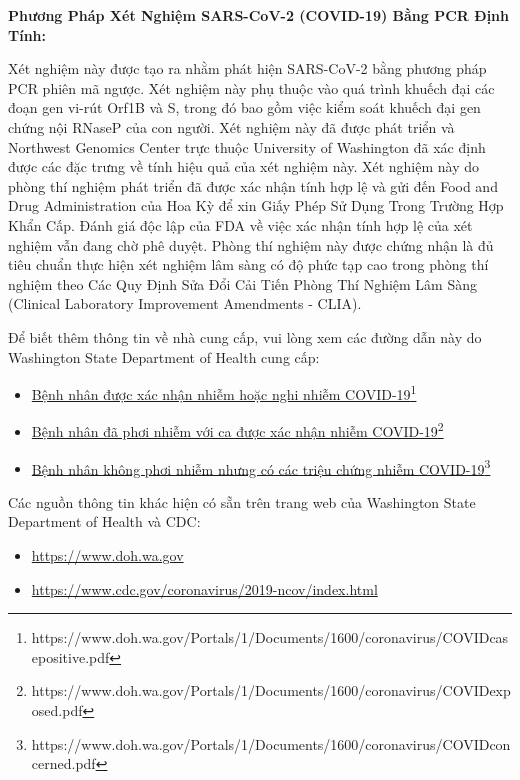 \documentclass[10pt]{article}
\newcommand{\link}[2]{\href{#1}{#2}\footnote{#1}}
\begin{document}
\bigskip
\textbf{Phương Pháp Xét Nghiệm SARS-CoV-2 (COVID-19) Bằng PCR Định Tính:}

Xét nghiệm này được tạo ra nhằm phát hiện SARS-CoV-2 bằng phương pháp PCR phiên
mã ngược. Xét nghiệm này phụ thuộc vào quá trình khuếch đại các đoạn gen vi-rút
Orf1B và S, trong đó bao gồm việc kiểm soát khuếch đại gen chứng nội RNaseP của
con người. Xét nghiệm này đã được phát triển và Northwest Genomics Center trực
thuộc University of Washington đã xác định được các đặc trưng về tính hiệu quả
của xét nghiệm này. Xét nghiệm này do phòng thí nghiệm phát triển đã được xác
nhận tính hợp lệ và gửi đến Food and Drug Administration của Hoa Kỳ để xin Giấy
Phép Sử Dụng Trong Trường Hợp Khẩn Cấp. Đánh giá độc lập của FDA về việc xác
nhận tính hợp lệ của xét nghiệm vẫn đang chờ phê duyệt. Phòng thí nghiệm này
được chứng nhận là đủ tiêu chuẩn thực hiện xét nghiệm lâm sàng có độ phức tạp
cao trong phòng thí nghiệm theo Các Quy Định Sửa Đổi Cải Tiến Phòng Thí Nghiệm
Lâm Sàng (Clinical Laboratory Improvement Amendments - CLIA).

Để biết thêm thông tin về nhà cung cấp, vui lòng xem các đường dẫn này do
Washington State Department of Health cung cấp:

\begin{itemize}
\item

  \link{https://www.doh.wa.gov/Portals/1/Documents/1600/coronavirus/COVIDcasepositive.pdf}{Bệnh
  nhân được xác nhận nhiễm hoặc nghi nhiễm COVID-19}

\item

  \link{https://www.doh.wa.gov/Portals/1/Documents/1600/coronavirus/COVIDexposed.pdf}{Bệnh
  nhân đã phơi nhiễm với ca được xác nhận nhiễm COVID-19}

\item

  \link{https://www.doh.wa.gov/Portals/1/Documents/1600/coronavirus/COVIDconcerned.pdf}{Bệnh
  nhân không phơi nhiễm nhưng có các triệu chứng nhiễm COVID-19}

\end{itemize}

Các nguồn thông tin khác hiện có sẵn trên trang web của Washington State
Department of Health và CDC:

\begin{itemize}
\item

  \url{https://www.doh.wa.gov}

\item

  \url{https://www.cdc.gov/coronavirus/2019-ncov/index.html}

\end{itemize}
\end{document}
